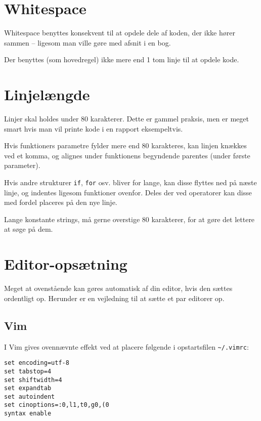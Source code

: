 \documentclass[article, 10pt]{memoir}
\let\tempone\itemize
\let\temptwo\enditemize
\renewenvironment{itemize}{\tempone\firmlist}{\temptwo}
\begin{document}
\begin{multicols}{2}
    \section{Whitespace}
    \begin{itemize}
    \item Whitespace benyttes konsekvent til at opdele dele af koden, der ikke hører sammen -- ligesom man ville gøre med afsnit i en bog.
    \item Der benyttes (som hovedregel) ikke mere end 1 tom linje til at opdele kode.
    \end{itemize}

    \section{Linjelængde}
    \begin{itemize}
    \item Linjer skal holdes under 80 karakterer. Dette er gammel praksis, men er meget smart hvis man vil printe kode i en rapport eksempeltvis.
    \item Hvis funktioners parametre fylder mere end 80 karakteres, kan linjen knækkes ved et komma, og alignes under funktionens begyndende parentes (under første parameter).
    \item Hvis andre strukturer \texttt{if}, \texttt{for} osv. bliver for lange, kan disse flyttes ned på næste linje, og indentes ligesom funktioner ovenfor. Deles der ved operatorer kan disse med fordel placeres på den nye linje.
    \item Lange konstante strings, må gerne overstige 80 karakterer, for at gøre det lettere at søge på dem.
    \end{itemize}

    \section{Editor-opsætning}
    Meget at ovenstående kan gøres automatisk af din editor, hvis den sættes ordentligt op. Herunder er en vejledning til at sætte et par editorer op.

    \subsection{Vim}
    I Vim gives ovennævnte effekt ved at placere følgende i opstartsfilen \verb|~/.vimrc|:
    \begin{lstlisting}
set encoding=utf-8
set tabstop=4
set shiftwidth=4
set expandtab
set autoindent
set cinoptions=:0,l1,t0,g0,(0
syntax enable
    \end{lstlisting}


\end{multicols}
\end{document}
